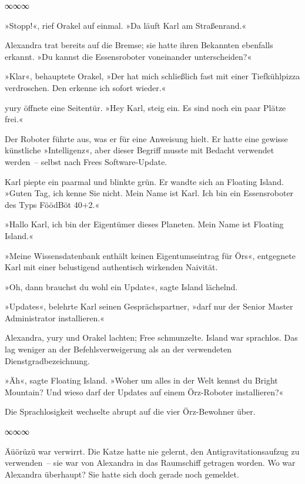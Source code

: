 \begin{center}
∞∞∞
\end{center}

»Stopp!«, rief Orakel auf einmal. »Da läuft Karl am Straßenrand.«

Alexandra trat bereits auf die Bremse; sie hatte ihren Bekannten ebenfalls erkannt. »Du kannst die Essensroboter voneinander unterscheiden?«

»Klar«, behauptete Orakel, »Der hat mich schließlich fast mit einer Tiefkühlpizza verdroschen. Den erkenne ich sofort wieder.«

yury öffnete eine Seitentür. »Hey Karl, steig ein. Es sind noch ein paar Plätze frei.«

Der Roboter führte aus, was er für eine Anweisung hielt. Er hatte eine gewisse künstliche »Intelligenz«, aber dieser Begriff musste mit Bedacht verwendet werden~– selbst nach Frees Software-Update.

Karl piepte ein paarmal und blinkte grün. Er wandte sich an Floating Island. »Guten Tag, ich kenne Sie nicht. Mein Name ist Karl. Ich bin ein Essensroboter des Typs FöödBöt 40+2.«

»Hallo Karl, ich bin der Eigentümer dieses Planeten. Mein Name ist Floating Island.«

»Meine Wissensdatenbank enthält keinen Eigentumseintrag für Örs«, entgegnete Karl mit einer belustigend authentisch wirkenden Naivität.

»Oh, dann brauchst du wohl ein Update«, sagte Island lächelnd.

»Updates«, belehrte Karl seinen Gesprächspartner, »darf nur der Senior Master Administrator installieren.«

Alexandra, yury und Orakel lachten; Free schmunzelte. Island war sprachlos. Das lag weniger an der Befehlsverweigerung als an der verwendeten Dienstgradbezeichnung.

»Äh«, sagte Floating Island. »Woher um alles in der Welt kennst du Bright Mountain? Und wieso darf der Updates auf einem Örz-Roboter installieren?«

Die Sprachlosigkeit wechselte abrupt auf die vier Örz-Bewohner über.

\begin{center}
∞∞∞
\end{center}

Äüörüzü war verwirrt. Die Katze hatte nie gelernt, den Antigravitationsaufzug zu verwenden~– sie war von Alexandra in das Raumschiff getragen worden. Wo war Alexandra überhaupt? Sie hatte sich doch gerade noch gemeldet.

